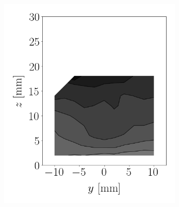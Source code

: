 \begin{figure}[h!]
\vspace*{-0.25in}

\flushleft
\begin{subfigure}[b]{0.2\textwidth}
	\flushleft
   \includegraphics[scale=0.4]{./part2_developments/figures_ch6_lagrangian_JICF/params_gaseous_initial_conditions/maps/expe_SMD}
\end{subfigure}
\hspace*{0.25in}
\begin{subfigure}[b]{0.2\textwidth}
	\flushleft

\end{subfigure}
\end{figure}
